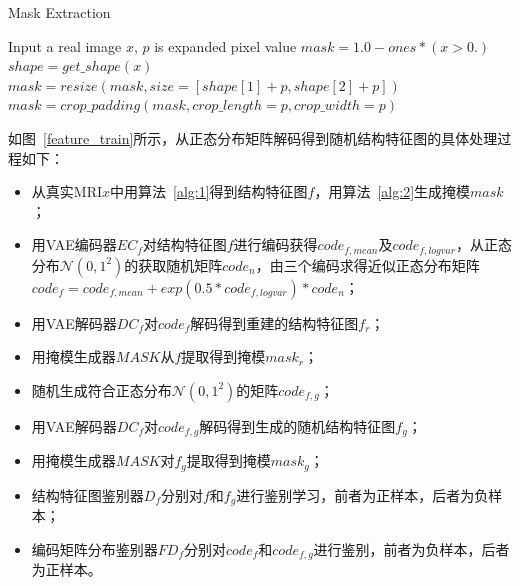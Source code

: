 \documentclass[letterpaper]{article} %
\begin{document}
\begin{algorithm}
	\caption{Mask Extraction}
	\label{alg:2}
	\begin{algorithmic}[1]
		\State Input a real image $x$, $p$ is expanded pixel value
		\State $mask = 1.0 - ones * (x > 0.)$
		\State $shape = get\_shape(x)$
		\State $mask = resize(mask, size=[shape[1] + p, shape[2] + p])$
		\State $mask = crop\_padding(mask, crop\_length=p, crop\_width=p)$
	\end{algorithmic}  
\end{algorithm}
如图~\ref{feature_train}所示，从正态分布矩阵解码得到随机结构特征图的具体处理过程如下：
\begin{itemize}
	\item 从真实MRI$x$中用算法~\ref{alg:1}得到结构特征图$f$，用算法~\ref{alg:2}生成掩模$mask$；
	\item 用VAE编码器$EC_f$对结构特征图$f$进行编码获得$code_{f,mean}$及$code_{f,logvar}$，从正态分布$\mathcal{N}(0,1^2)$的获取随机矩阵$code_n$，由三个编码求得近似正态分布矩阵$code_f=code_{f,mean}+exp(0.5*code_{f,logvar})*code_n$；
	\item 用VAE解码器$DC_f$对$code_f$解码得到重建的结构特征图$f_r$；
	\item 用掩模生成器$MASK$从$f$提取得到掩模$mask_r$；
	\item 随机生成符合正态分布$\mathcal{N}(0,1^2)$的矩阵$code_{f,g}$；
	\item 用VAE解码器$DC_f$对$code_{f,g}$解码得到生成的随机结构特征图$f_g$；
	\item 用掩模生成器$MASK$对$f_g$提取得到掩模$mask_g$；
	\item 结构特征图鉴别器$D_f$分别对$f$和$f_g$进行鉴别学习，前者为正样本，后者为负样本；
	\item 编码矩阵分布鉴别器$FD_f$分别对$code_f$和$code_{f,g}$进行鉴别，前者为负样本，后者为正样本。
\end{itemize}
\end{document}
